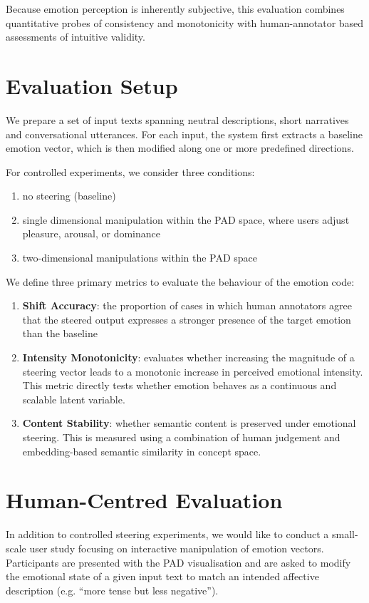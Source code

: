 \documentclass[12pt,twoside]{report}
\begin{document}
Because emotion perception is inherently subjective, this evaluation combines quantitative probes of consistency and monotonicity with human-annotator based assessments of intuitive validity.

\section{Evaluation Setup}

We prepare a set of input texts spanning neutral descriptions, short narratives and conversational utterances. For each input, the system first extracts a baseline emotion vector, which is then modified along one or more predefined directions.

For controlled experiments, we consider three conditions:
\begin{enumerate}
    \item no steering (baseline)
    \item single dimensional manipulation within the PAD space, where users adjust pleasure, arousal, or dominance
    \item two-dimensional manipulations within the PAD space
\end{enumerate}

We define three primary metrics to evaluate the behaviour of the emotion code:
\begin{enumerate}
    \item \textbf{Shift Accuracy}: the proportion of cases in which human annotators agree that the steered output expresses a stronger presence of the target emotion than the baseline
    \item \textbf{Intensity Monotonicity}: evaluates whether increasing the magnitude of a steering vector leads to a monotonic increase in perceived emotional intensity. This metric directly tests whether emotion behaves as a continuous and scalable latent variable.
    \item \textbf{Content Stability}: whether semantic content is preserved under emotional steering. This is measured using a combination of human judgement and embedding-based semantic similarity in concept space.
\end{enumerate}

\section{Human-Centred Evaluation}

In addition to controlled steering experiments, we would like to conduct a small-scale user study focusing on interactive manipulation of emotion vectors. Participants are presented with the PAD visualisation and are asked to modify the emotional state of a given input text to match an intended affective description (e.g. ``more tense but less negative'').
\end{document}
